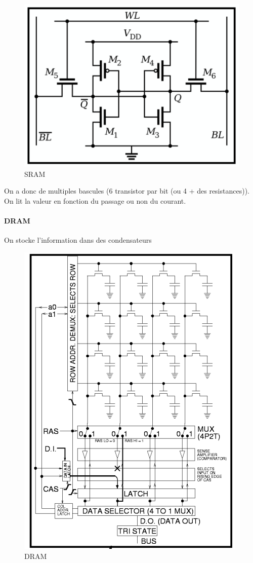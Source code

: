\begin{figure}
\centering
\includegraphics{image-8.png}
\caption{SRAM}
\end{figure}

On a donc de multiples bascules (6 transistor par bit (ou 4 + des
resistances)). On lit la valeur en fonction du passage ou non du
courant.

\paragraph{DRAM}\label{dram}

On stocke l'information dans des condensateurs

\begin{figure}
\centering
\includegraphics{image-9.png}
\caption{DRAM}
\end{figure}

